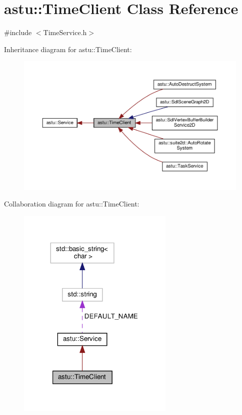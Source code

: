 \hypertarget{classastu_1_1TimeClient}{}\section{astu\+:\+:Time\+Client Class Reference}
\label{classastu_1_1TimeClient}


{\ttfamily \#include $<$Time\+Service.\+h$>$}



Inheritance diagram for astu\+:\+:Time\+Client\+:
\nopagebreak
\begin{figure}[H]
\begin{center}
\leavevmode
\includegraphics[width=350pt]{classastu_1_1TimeClient__inherit__graph}
\end{center}
\end{figure}


Collaboration diagram for astu\+:\+:Time\+Client\+:
\nopagebreak
\begin{figure}[H]
\begin{center}
\leavevmode
\includegraphics[width=212pt]{classastu_1_1TimeClient__coll__graph}
\end{center}
\end{figure}
